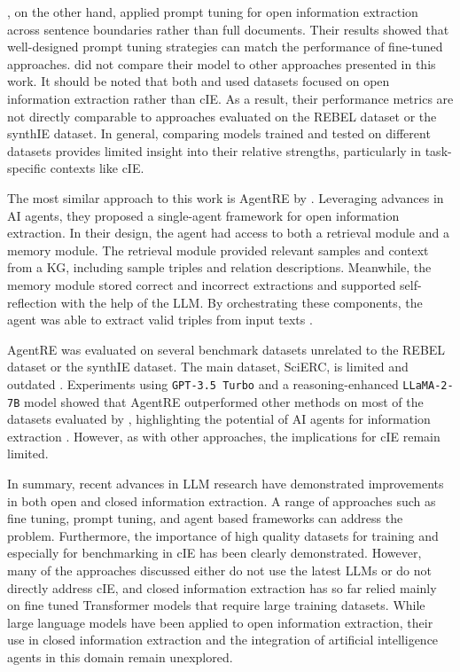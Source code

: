 \documentclass[a4paper,oneside,bibliography=totoc]{scrbook}
\begin{document}
\citet{Chen2024}, on the other hand, applied prompt tuning for open information extraction across sentence boundaries rather than full documents. Their results showed that well-designed prompt tuning strategies can match the performance of fine-tuned approaches. \citet{Chen2024} did not compare their model to other approaches presented in this work. It should be noted that both \citet{Chen2024} and \citet{Xue2024} used datasets focused on open information extraction rather than \ac{cIE}. As a result, their performance metrics are not directly comparable to approaches evaluated on the REBEL dataset or the synthIE dataset. In general, comparing models trained and tested on different datasets provides limited insight into their relative strengths, particularly in task-specific contexts like \ac{cIE}.

The most similar approach to this work is AgentRE by \citet{Shi2024}. Leveraging advances in AI agents, they proposed a single-agent framework for open information extraction. In their design, the agent had access to both a retrieval module and a memory module. The retrieval module provided relevant samples and context from a \ac{KG}, including sample triples and relation descriptions. Meanwhile, the memory module stored correct and incorrect extractions and supported self-reflection with the help of the \ac{LLM}. By orchestrating these components, the agent was able to extract valid triples from input texts \cite{Shi2024}.

AgentRE was evaluated on several benchmark datasets unrelated to the REBEL dataset or the synthIE dataset. The main dataset, SciERC, is limited and outdated \cite{Luan2018}. Experiments using \texttt{GPT-3.5 Turbo} and a reasoning-enhanced \texttt{LLaMA-2-7B} model showed that AgentRE outperformed other methods on most of the datasets evaluated by \citet{Shi2024}, highlighting the potential of AI agents for information extraction \cite{Shi2024}. However, as with other approaches, the implications for \ac{cIE} remain limited.

In summary, recent advances in \ac{LLM} research have demonstrated improvements in both open and closed information extraction. A range of approaches such as fine tuning, prompt tuning, and agent based frameworks can address the problem. Furthermore, the importance of high quality datasets for training and especially for benchmarking in \ac{cIE} has been clearly demonstrated. However, many of the approaches discussed either do not use the latest \acp{LLM} or do not directly address \ac{cIE}, and closed information extraction has so far relied mainly on fine tuned Transformer models that require large training datasets. While large language models have been applied to open information extraction, their use in closed information extraction and the integration of artificial intelligence agents in this domain remain unexplored.
\end{document}
